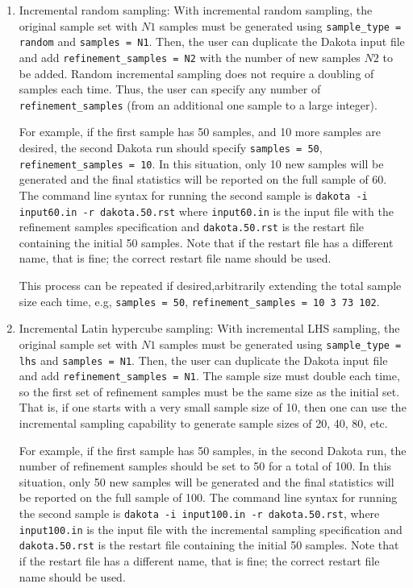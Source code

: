 \begin{enumerate}

\item Incremental random sampling: With incremental random sampling,
  the original sample set with $N1$ samples must be generated using
  \texttt{sample\_type = random} and \texttt{samples = N1}.  Then, the
  user can duplicate the Dakota input file and add
  \texttt{refinement\_samples = N2} with the number of new samples
  $N2$ to be added.  Random incremental sampling does not require a
  doubling of samples each time. Thus, the user can specify any number
  of \texttt{refinement\_samples} (from an additional one sample to a
  large integer).

  For example, if the first sample has 50 samples, and 10 more samples
  are desired, the second Dakota run should specify \texttt{samples =
    50}, \texttt{refinement\_samples = 10}.  In this situation, only
  10 new samples will be generated and the final statistics will be
  reported on the full sample of 60. The command line syntax for
  running the second sample is \texttt{dakota -i input60.in -r
    dakota.50.rst} where \texttt{input60.in} is the input file with
  the refinement samples specification and \texttt{dakota.50.rst} is
  the restart file containing the initial 50 samples.  Note that if
  the restart file has a different name, that is fine; the correct
  restart file name should be used.

  This process can be repeated if desired,arbitrarily extending the
  total sample size each time, e.g, \texttt{samples = 50},
  \texttt{refinement\_samples = 10  3  73  102}.

\item Incremental Latin hypercube sampling: With incremental LHS
  sampling, the original sample set with $N1$ samples must be
  generated using \texttt{sample\_type = lhs} and \texttt{samples =
    N1}.  Then, the user can duplicate the Dakota input file and add
  \texttt{refinement\_samples = N1}.  The sample size must double each
  time, so the first set of refinement samples must be the same size
  as the initial set.  That is, if one starts with a very small sample
  size of 10, then one can use the incremental sampling capability to
  generate sample sizes of 20, 40, 80, etc.

  For example, if the first sample has 50 samples, in the second
  Dakota run, the number of refinement samples should be set to 50 for
  a total of 100. In this situation, only 50 new samples will be
  generated and the final statistics will be reported on the full
  sample of 100. The command line syntax for running the second sample
  is \texttt{dakota -i input100.in -r dakota.50.rst}, where
  \texttt{input100.in} is the input file with the incremental sampling
  specification and \texttt{dakota.50.rst} is the restart file
  containing the initial 50 samples.  Note that if the restart file
  has a different name, that is fine; the correct restart file name
  should be used.


\end{enumerate}
